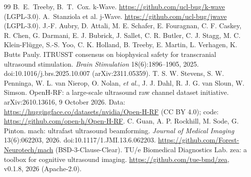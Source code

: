 \documentclass[11pt,a4paper]{article}
\begin{document}
\begin{thebibliography}{99}
 B.~E.~Treeby, B.~T.~Cox. k-Wave. \url{https://github.com/ucl-bug/k-wave} (LGPL-3.0).
 A.~Stanziola et al. j-Wave. \url{https://github.com/ucl-bug/jwave} (LGPL-3.0).
 J.-F. Aubry, D. Attali, M. E. Schafer, E. Fouragnan, C. F. Caskey, R. Chen, G. Darmani, E. J. Bubrick, J. Sallet, C. R. Butler, C. J. Stagg, M. C. Klein-Fl\"ugge, S.-S. Yoo, C. K. Holland, B. Treeby, E. Martin, L. Verhagen, K. Butts Pauly. ITRUSST consensus on biophysical safety for transcranial ultrasound stimulation. \emph{Brain Stimulation} 18(6):1896--1905, 2025. doi:10.1016/j.brs.2025.10.007 (arXiv:2311.05359).
 T. S. W. Stevens, S. W. Penninga, W. L. van Nierop, O. Nolan, \emph{et al.}, J. J. Dahl, R. J. G. van Sloun, W. Simson. OpenH-RF: a large-scale ultrasound raw channel dataset initiative. arXiv:2610.13616, 9 October 2026. Data: \url{https://huggingface.co/datasets/nvidia/Open-H-RF} (CC BY 4.0); code: \url{https://github.com/open-h/Open-H-RF}.
 C. Guan, A. P. Rockhill, M. Sode, G. Pinton. mach: ultrafast ultrasound beamforming. \emph{Journal of Medical Imaging} 13(6):062203, 2026. doi:10.1117/1.JMI.13.6.062203. \url{https://github.com/Forest-Neurotech/mach} (BSD-3-Clause-Clear).
 TU/e Biomedical Diagnostics Lab. zea: a toolbox for cognitive ultrasound imaging. \url{https://github.com/tue-bmd/zea}, v0.1.8, 2026 (Apache-2.0).
\end{thebibliography}
\end{document}

